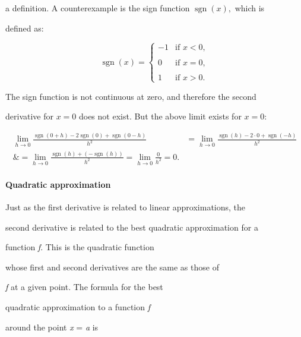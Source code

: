 a definition. A counterexample is the sign function $\operatorname{sgn}(x),$ which is

defined as:



$$\operatorname{sgn}(x) = 

\begin{cases}

-1 & \text{if } x < 0, \\\\ 0 & \text{if } x = 0, \\\\ 1 & \text{if } x > 0. 

\end{cases}$$



The sign function is not continuous at zero, and therefore the second

derivative for $x=0$ does not exist. But the above limit exists for $x=0$:



\begin{align}
\lim_{h \to 0} \frac{\operatorname{sgn}(0+h) - 2\operatorname{sgn}(0) + \operatorname{sgn}(0-h)}{h^2} &= \lim_{h \to 0} \frac{\operatorname{sgn}(h) - 2\cdot 0 + \operatorname{sgn}(-h)}{h^2} \\\&= \lim_{h \to 0} \frac{\operatorname{sgn}(h) + (-\operatorname{sgn}(h))}{h^2} = \lim_{h \to 0} \frac{0}{h^2} = 0.
\end{align}



\paragraph{Quadratic approximation}



Just as the first derivative is related to linear approximations, the

second derivative is related to the best quadratic approximation for a

function \textit{f}. This is the quadratic function

whose first and second derivatives are the same as those of

\textit{f} at a given point. The formula for the best

quadratic approximation to a function \textit{f}

around the point \textit{x} = \textit{a} is



